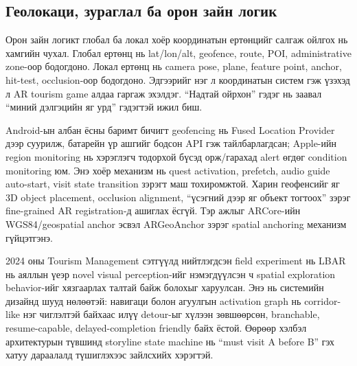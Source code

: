 \begin{sloppy}
\section*{Геолокаци, зураглал ба орон зайн логик}

Орон зайн логикт глобал ба локал хоёр координатын ертөнцийг салгаж ойлгох нь хамгийн чухал. Глобал ертөнц нь lat/lon/alt, geofence, route, POI, administrative zone-оор бодогдоно. Локал ертөнц нь camera pose, plane, feature point, anchor, hit-test, occlusion-оор бодогдоно. Эдгээрийг нэг л координатын систем гэж үзэхэд л AR tourism game алдаа гаргаж эхэлдэг. ``Надтай ойрхон'' гэдэг нь заавал ``миний дэлгэцийн яг урд'' гэдэгтэй ижил биш.

Android-ын албан ёсны баримт бичигт geofencing нь Fused Location Provider дээр суурилж, батарейн үр ашгийг бодсон API гэж тайлбарлагдсан; Apple-ийн region monitoring нь хэрэглэгч тодорхой бүсэд орж/гарахад alert өгдөг condition monitoring юм. Энэ хоёр механизм нь quest activation, prefetch, audio guide auto-start, visit state transition зэрэгт маш тохиромжтой. Харин геофенсийг яг 3D object placement, occlusion alignment, ``үсэгний дээр яг объект тогтоох'' зэрэг fine-grained AR registration-д ашиглах ёсгүй. Тэр ажлыг ARCore-ийн WGS84/geospatial anchor эсвэл ARGeoAnchor зэрэг spatial anchoring механизм гүйцэтгэнэ.

2024 оны Tourism Management сэтгүүлд нийтлэгдсэн field experiment нь LBAR нь аяллын үеэр novel visual perception-ийг нэмэгдүүлсэн ч spatial exploration behavior-ийг хязгаарлах талтай байж болохыг харуулсан. Энэ нь системийн дизайнд шууд нөлөөтэй: навигаци болон агуулгын activation graph нь corridor-like нэг чиглэлтэй байхаас илүү detour-ыг хүлээн зөвшөөрсөн, branchable, resume-capable, delayed-completion friendly байх ёстой. Өөрөөр хэлбэл архитектурын түвшинд storyline state machine нь ``must visit A before B'' гэх хатуу дараалалд түшиглэхээс зайлсхийх хэрэгтэй.


\end{sloppy}
